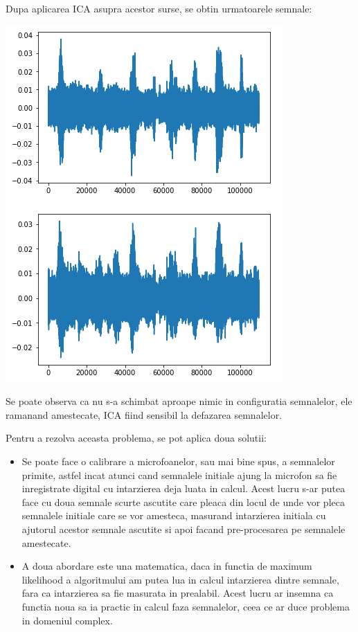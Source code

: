 \documentclass[12pt]{article}
\begin{document}
 Dupa aplicarea ICA asupra acestor surse, se obtin urmatoarele semnale:
\begin{center}
	\includegraphics[scale=1]{real_separated}
 \end{center}

 Se poate observa ca nu s-a schimbat aproape nimic in configuratia semnalelor, ele ramanand amestecate, ICA fiind sensibil la defazarea semnalelor.

 Pentru a rezolva aceasta problema, se pot aplica doua solutii:
 \begin{itemize}
	\item{Se poate face o calibrare a microfoanelor, sau mai bine spus, a semnalelor primite, astfel incat atunci cand semnalele initiale ajung la microfon sa fie inregistrate digital cu intarzierea deja luata in calcul. Acest lucru s-ar putea face cu doua semnale scurte ascutite care pleaca din locul de unde vor pleca semnalele initiale care se vor amesteca, masurand intarzierea initiala cu ajutorul acestor semnale ascutite si apoi facand pre-procesarea pe semnalele amestecate.} 
	\item{A doua abordare este una matematica, daca in functia de maximum likelihood a algoritmului am putea lua in calcul intarzierea dintre semnale, fara ca intarzierea sa fie masurata in prealabil. Acest lucru ar insemna ca functia noua sa ia practic in calcul faza semnalelor, ceea ce ar duce problema in domeniul complex.}
 \end{itemize}
\end{document}
